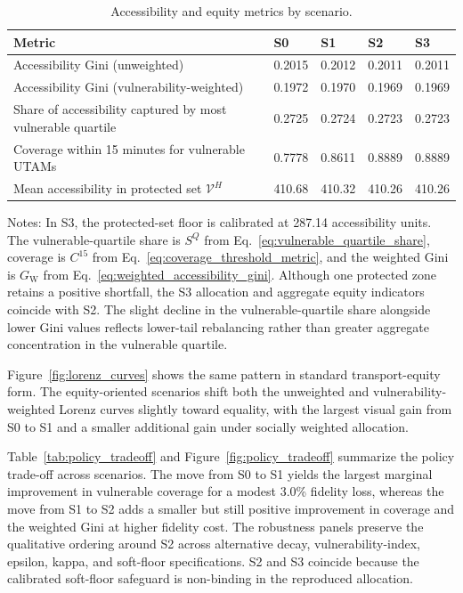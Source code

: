 \documentclass[final,5p,times,twocolumn,authoryear]{elsarticle}
\begin{document}
\begin{table}[htbp]
\centering
\caption{Accessibility and equity metrics by scenario.}
\label{tab:equity_metrics}
\begin{threeparttable}
\footnotesize
\begin{tabularx}{\textwidth}{Y Z Z Z Z}
\toprule
Metric & S0 & S1 & S2 & S3 \\
\midrule
Accessibility Gini (unweighted) & 0.2015 & 0.2012 & 0.2011 & 0.2011 \\
Accessibility Gini (vulnerability-weighted) & 0.1972 & 0.1970 & 0.1969 & 0.1969 \\
Share of accessibility captured by most vulnerable quartile & 0.2725 & 0.2724 & 0.2723 & 0.2723 \\
Coverage within 15 minutes for vulnerable UTAMs & 0.7778 & 0.8611 & 0.8889 & 0.8889 \\
Mean accessibility in protected set $\mathcal{V}^{H}$ & 410.68 & 410.32 & 410.26 & 410.26 \\
\bottomrule
\end{tabularx}
\begin{tablenotes}[flushleft]
\footnotesize
\item Notes: In S3, the protected-set floor is calibrated at 287.14 accessibility units. The vulnerable-quartile share is $S^{Q}$ from Eq.~\eqref{eq:vulnerable_quartile_share}, coverage is $C^{15}$ from Eq.~\eqref{eq:coverage_threshold_metric}, and the weighted Gini is $G_{\mathrm{W}}$ from Eq.~\eqref{eq:weighted_accessibility_gini}. Although one protected zone retains a positive shortfall, the S3 allocation and aggregate equity indicators coincide with S2. The slight decline in the vulnerable-quartile share alongside lower Gini values reflects lower-tail rebalancing rather than greater aggregate concentration in the vulnerable quartile.
\end{tablenotes}
\normalsize
\end{threeparttable}
\end{table}

Figure~\ref{fig:lorenz_curves} shows the same pattern in standard transport-equity form. The
equity-oriented scenarios shift both the unweighted and vulnerability-weighted Lorenz
curves slightly toward equality, with the largest visual gain from S0 to S1 and a smaller
additional gain under socially weighted allocation.

Table~\ref{tab:policy_tradeoff} and Figure~\ref{fig:policy_tradeoff} summarize the policy
trade-off across scenarios. The move from S0 to S1 yields the largest marginal improvement
in vulnerable coverage for a modest 3.0\% fidelity loss, whereas the move from S1 to S2
adds a smaller but still positive improvement in coverage and the weighted Gini at higher
fidelity cost. The robustness panels preserve the qualitative ordering around S2 across
alternative decay, vulnerability-index, epsilon, kappa, and soft-floor specifications. S2
and S3 coincide because the calibrated soft-floor safeguard is non-binding in the reproduced
allocation.
\end{document}
